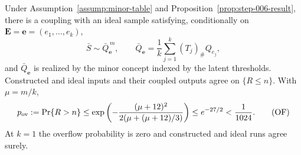 \begin{proposition}
\label{prop:step-007-result}
Under Assumption~\ref{assump:minor-table} and
Proposition~\ref{prop:step-006-result}, there is a coupling with an ideal
sample satisfying, conditionally on
$\mathbf E=\mathbf e=(e_1,\ldots,e_k)$,
\[
\bar S\sim\bar Q_{\mathbf e}^{\,m},\qquad
\bar Q_{\mathbf e}=\frac1k\sum_{j=1}^k(T_j)_\#Q_{e_j},
\]
and $\bar Q_{\mathbf e}$ is realized by the minor concept indexed by the
latent thresholds.  Constructed and ideal inputs and their coupled
outputs agree on $\{R\leq n\}$.  With $\mu=m/k$,
\[
p_{\rm ov}:=\Pr\{R>n\}
\leq\exp\left(-\frac{(\mu+12)^2}
  {2(\mu+(\mu+12)/3)}\right)
\leq e^{-27/2}<\frac1{1024}.
\tag{OF}\label{eq:overflow}
\]
At $k=1$ the overflow probability is zero and constructed and ideal runs
agree surely.
\end{proposition}
